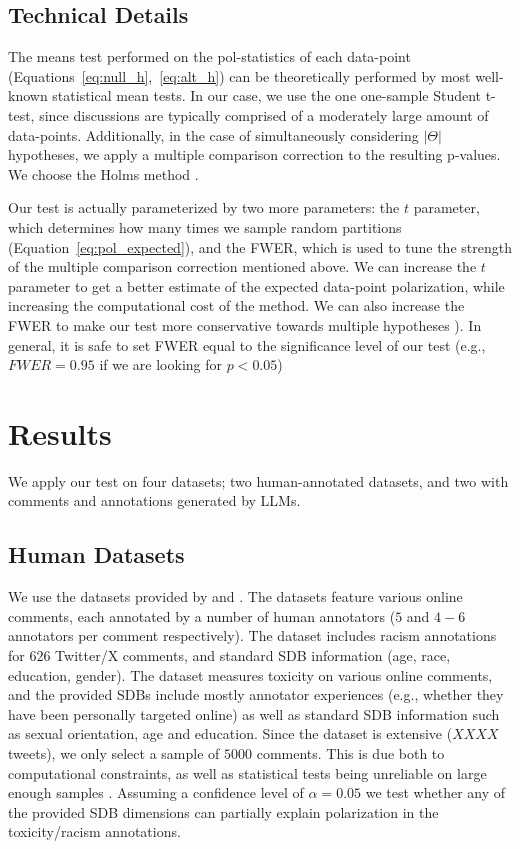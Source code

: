 \documentclass{article}
\begin{document}
\subsection{Technical Details}
\label{ssec:methodology:details}

The means test performed on the pol-statistics of each data-point (Equations~\ref{eq:null_h},~\ref{eq:alt_h}) can be theoretically performed by most well-known statistical mean tests. In our case, we use the one one-sample Student t-test, since discussions are typically comprised of a moderately large amount of data-points. Additionally, in the case of simultaneously considering $\lvert \Theta \rvert$ hypotheses, we apply a multiple comparison correction to the resulting p-values. We choose the Holms method \parencite{holms}.

Our test is actually parameterized by two more parameters: the $t$ parameter, which determines how many times we sample random partitions (Equation~\ref{eq:pol_expected}), and the \ac{FWER}, which is used to tune the strength of the multiple comparison correction mentioned above. We can increase the $t$ parameter to get a better estimate of the expected data-point polarization, while increasing the computational cost of the method. We can also increase the \ac{FWER} to make our test more conservative towards multiple hypotheses \parencite{ChenFengYi2017}). In general, it is safe to set \ac{FWER} equal to the significance level of our test (e.g., $\textit{FWER} = 0.95$ if we are looking for $p < 0.05$)


\section{Results}

We apply our test on four datasets; two human-annotated datasets, and two with comments and annotations generated by \acp{LLM}.

\subsection{Human Datasets}

We use the datasets provided by \textcite{kumar-et-al-2021} and \textcite{sap-etal-2022-annotators}. The datasets feature various online comments, each annotated by a number of human annotators ($5$ and $4-6$ annotators per comment respectively). The \textcite{sap-etal-2022-annotators} dataset includes racism annotations for $626$ Twitter/X comments, and standard \ac{SDB} information (age, race, education, gender). The \textcite{kumar-et-al-2021} dataset measures toxicity on various online comments, and the provided \acp{SDB} include mostly annotator experiences (e.g., whether they have been personally targeted online) as well as standard \ac{SDB} information such as sexual orientation, age and education. Since the dataset is extensive ($XXXX$ tweets), we only select a sample of $5000$ comments. This is due both to computational constraints, as well as statistical tests being unreliable on large enough samples \cite{trafimow2018manipulating}. Assuming a confidence level of $\alpha=0.05$ we test whether any of the provided \ac{SDB} dimensions can partially explain polarization in the toxicity/racism annotations. 
\end{document}
